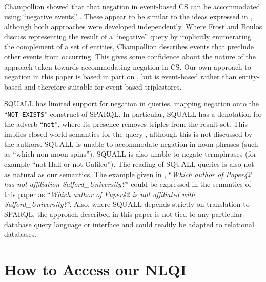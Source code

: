 \documentclass[../main.tex]{subfiles}
\begin{document}
\begin{refsection}
Champollion showed that that negation in event-based CS can be accommodated using ``negative events'' \cite{champollion2011}.  These appear to be similar to the ideas expressed in \cite{frostboulos2002}, although both approaches were developed independently.
Where Frost and Boulos discuss representing the result of a ``negative'' query by implicitly enumerating the complement of a set of entities, Champollion describes events that preclude other events from occurring.  This gives some confidence about the nature of the approach taken towards accommodating negation in CS. Our own approach to negation in this paper is based in part on \cite{frostboulos2002}, but is event-based rather than entity-based and therefore suitable for event-based triplestores.


SQUALL \cite{ferre:squall} has limited support for negation in queries, mapping negation onto the ``\texttt{NOT EXISTS}'' construct of SPARQL.  In particular, SQUALL has a denotation for the adverb ``\texttt{not}'', where its presence removes triples from the result set.  This implies closed-world semantics for the query \cite{dazari2014bridging}, although this is not discussed by the authors.  SQUALL is unable to accommodate negation in noun-phrases (such as ``which non-moon spins'').  SQUALL is also unable to negate termphrases (for example ``not Hall or not Galileo'').  The reading of SQUALL queries is also not as natural as our semantics.  The example given in \cite{ferre2014squall}, ``\textit{Which author of Paper42 has not affiliation Salford\_University?}'' could be expressed in the semantics of this paper as ``\textit{Which author of Paper42 is not affiliated with Salford\_University?}''.  Also, where SQUALL depends strictly on translation to SPARQL, the approach described in this paper is not tied to any particular database query language or interface and could readily be adapted to relational databases.


\section{How to Access our NLQI}
\label{sec:demo}


\end{refsection}
\end{document}
